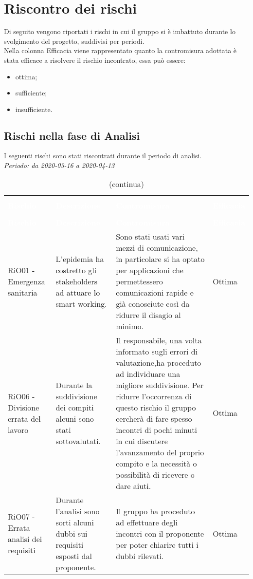 \section{Riscontro dei rischi}
Di seguito vengono riportati i rischi in cui il gruppo si è imbattuto durante lo svolgimento del progetto, suddivisi per periodi. \\
Nella colonna Efficacia viene rappresentato quanto la contromisura adottata è stata efficace a risolvere il rischio incontrato, essa può essere:
\begin{itemize}
	\item ottima;
	\item sufficiente;
	\item insufficiente.
\end{itemize}

\subsection{Rischi nella fase di Analisi}
I seguenti rischi sono stati riscontrati durante il periodo di analisi. \\
\textit{Periodo: da 2020-03-16 a 2020-04-13}

\begin{longtable}{C{3cm} L{4.5cm} L{5.5cm} C{2cm}}
\caption{Attualizzazione dei rischi - Analisi} \\
\textcolor{white}{\textbf{Rischio}} &
\textcolor{white}{\textbf{Descrizione}} &
\textcolor{white}{\textbf{Contromisura}} &
\textcolor{white}{\textbf{Efficacia}}\\
		\endfirsthead
		\caption[]{(continua)} \\
\textcolor{white}{\textbf{Rischio}} &
\textcolor{white}{\textbf{Descrizione}} &
\textcolor{white}{\textbf{Contromisura}} &
\textcolor{white}{\textbf{Efficacia}}\\
		\endhead

RiO01 - Emergenza sanitaria	& L'epidemia ha costretto gli stakeholders ad attuare lo smart working. & Sono stati usati vari mezzi di comunicazione, in particolare si ha optato per applicazioni che permettessero comunicazioni rapide e già conosciute così da ridurre il disagio al minimo. & Ottima
\\
RiO06 - Divisione errata del lavoro & Durante la suddivisione dei compiti alcuni sono stati sottovalutati. & Il responsabile, una volta informato sugli errori di valutazione,ha proceduto ad individuare una migliore suddivisione. Per ridurre l'occorrenza di questo rischio il gruppo cercherà di fare spesso incontri di pochi minuti in cui discutere l'avanzamento del proprio compito e la necessità o possibilità di ricevere o dare aiuti. & Ottima
\\
RiO07 - Errata analisi dei requisiti & Durante l'analisi sono sorti alcuni dubbi sui requisiti esposti dal proponente. & Il gruppo ha proceduto ad effettuare degli incontri con il proponente per poter chiarire tutti i dubbi rilevati. & Ottima
\\

\end{longtable}


